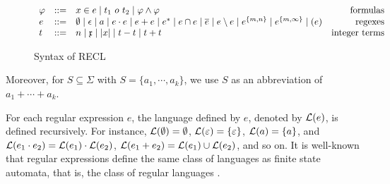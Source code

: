 \begin{figure}[h]
\vspace{-3mm}
  \centering
$ \begin{array}{l l l r}
    \varphi & ::= & x\in e \mid t_1\  o\ t_2 \mid  \varphi \wedge \varphi                                              & \mbox{formulas}            \\
    e &::= & \emptyset \mid \epsilon \mid a \mid e\cdot e \mid e+e \mid e^* \mid e \cap e \mid \overline{e} \mid e \setminus e \mid e^{\{m,n\}} \mid e^{\{m,\infty\}} \mid (e) & \mbox{regexes} \\
    t &::= & n \mid \mathfrak{x} \mid  |x| \mid t - t \mid t + t                                                                    & \mbox{integer terms}
    \end{array}
  $
  \caption{Syntax of RECL }\label{fig:syntax}
\vspace{-3mm}
\end{figure}
Moreover, for $S \subseteq \Sigma$ with $S = \{a_1, \cdots, a_k\}$, we use $S$ as an abbreviation of $a_1 + \cdots + a_k$.


For each regular expression $e$, the language defined by $e$, denoted by $\mathcal{L}(e)$, is defined recursively. For instance, $\mathcal{L}(\emptyset) = \emptyset$, $\mathcal{L}(\varepsilon) = \{\varepsilon\}$, $\mathcal{L}(a) = \{a\}$, and $\mathcal{L}(e_1 \cdot e_2) = \mathcal{L}(e_1) \cdot \mathcal{L}(e_2)$, $\mathcal{L}(e_1 + e_2) = \mathcal{L}(e_1) \cup \mathcal{L}(e_2)$, and so on. 
It is well-known that regular expressions define the same class of languages as finite state automata, that is, the class of regular languages \cite{HU79}. 


